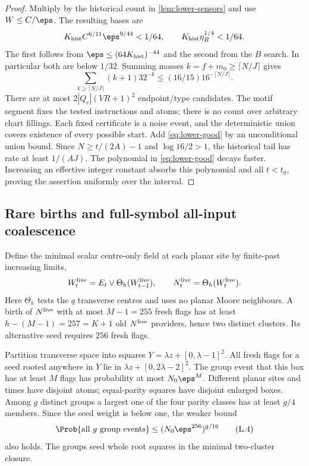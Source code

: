 \begin{proof}
Multiply by the historical count in \cref{lem:lower-sensors} and use $W\le C/\eps$. The resulting bases are
\[
 K_{\rm hist}C^{6/11}\eps^{9/44}<1/64,\qquad
 K_{\rm hist}\eta_B^{1/4}<1/64.
\]
The first follows from $\eps\le(64K_{\rm hist})^{-44}$ and the second from the $B$ search. In particular both are below $1/32$. Summing masses $k=f+m_0\ge\lceil N/J\rceil$ gives
\[
 \sum_{k\ge\lceil N/J\rceil}(k+1)32^{-k}
 \le(16/15)16^{-\lceil N/J\rceil}.
\]
There are at most $2|Q_r|(VR+1)^2$ endpoint/type candidates. The motif segment fixes the tested instructions and atoms; there is no count over arbitrary chart fillings. Each fixed certificate is a noise event, and the deterministic union covers existence of every possible start. Add \eqref{eq:lower-good} by an unconditional union bound. Since $N\ge t/(2A)-1$ and $\log16/2>1$, the historical tail has rate at least $1/(AJ)$. The polynomial in \eqref{eq:lower-good} decays faster. Increasing an effective integer constant absorbs this polynomial and all $t<t_0$, proving the assertion uniformly over the interval.
\end{proof}

\subsection{Rare births and full-symbol all-input coalescence}

Define the minimal scalar centre-only field at each planar site by finite-past increasing limits,
\[
 W^{\rm live}_t=E_t\vee\Theta_h(W^{\rm live}_{t-1}),\qquad
 N^{\rm live}_t=\Theta_h(W^{\rm live}_t).
\]
Here $\Theta_h$ tests the $q$ transverse centres and uses no planar Moore neighbours. A birth of $N^{\rm live}$ with at most $M-1=255$ fresh flags has at least $h-(M-1)=257=K+1$ old $N^{\rm live}$ providers, hence two distinct clusters. Its alternative seed requires $256$ fresh flags.

Partition transverse space into squares $Y=\lambda z+[0,\lambda-1]^2$. All fresh flags for a seed rooted anywhere in $Y$ lie in $\lambda z+[0,2\lambda-2]^2$. The group event that this box has at least $M$ flags has probability at most $N_0\eps^M$. Different planar sites and times have disjoint atoms; equal-parity squares have disjoint enlarged boxes. Among $g$ distinct groups a largest one of the four parity classes has at least $g/4$ members. Since the seed weight is below one, the weaker bound
\[
 \Prob\{\text{all }g\text{ group events}\}\le(N_0\eps^{256})^{g/16}
                                                               \tag{L.4}\label{eq:lower-seeds}
\]
also holds. The groups seed whole root squares in the minimal two-cluster closure.

